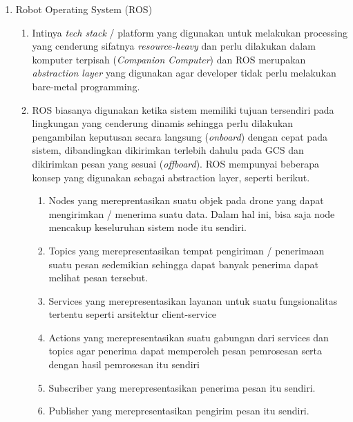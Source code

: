 \documentclass{article}
\begin{document}
\begin{enumerate}
    \item Robot Operating System (ROS)
    \begin{enumerate}
        \item Intinya \textit{tech stack} / platform yang digunakan untuk melakukan processing yang cenderung sifatnya \textit{resource-heavy} dan perlu dilakukan dalam komputer terpisah (\textit{Companion Computer}) dan ROS merupakan \textit{abstraction layer} yang digunakan agar developer tidak perlu melakukan bare-metal programming. 
        \item ROS biasanya digunakan ketika sistem memiliki tujuan tersendiri pada lingkungan yang cenderung dinamis sehingga perlu dilakukan pengambilan keputusan secara langsung (\textit{onboard}) dengan cepat pada sistem, dibandingkan dikirimkan terlebih dahulu pada GCS dan dikirimkan pesan yang sesuai (\textit{offboard}). ROS mempunyai beberapa konsep yang digunakan sebagai abstraction layer, seperti berikut.
        \begin{enumerate}
            \item Nodes yang mereprentasikan suatu objek pada drone yang dapat mengirimkan / menerima suatu data. Dalam hal ini, bisa saja node mencakup keseluruhan sistem node itu sendiri.
            \item Topics yang merepresentasikan tempat pengiriman / penerimaan suatu pesan sedemikian sehingga dapat banyak penerima dapat melihat pesan tersebut.  
            \item Services yang merepresentasikan layanan untuk suatu fungsionalitas tertentu seperti arsitektur client-service 
            \item Actions yang merepresentasikan suatu gabungan dari services dan topics agar penerima dapat memperoleh pesan pemrosesan serta dengan hasil pemrosesan itu sendiri
            \item Subscriber yang merepresentasikan penerima pesan itu sendiri.
            \item Publisher yang merepresentasikan pengirim pesan itu sendiri.
        \end{enumerate}
    \end{enumerate}


\end{enumerate}
\end{document}
